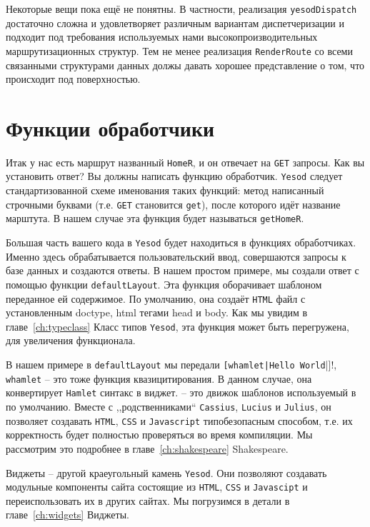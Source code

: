 Некоторые вещи пока ещё не понятны. В частности, реализация \lstinline!yesodDispatch!
достаточно сложна и удовлетворяет различным вариантам диспетчеризации
и подходит под требования используемых нами высокопроизводительных 
маршрутизационных структур.
Тем не менее реализация \lstinline!RenderRoute! со всеми связанными 
структурами данных должы давать хорошее представление о том, что происходит 
под поверхностью. %

\section{Функции обработчики}

Итак у нас есть маршрут названный \lstinline!HomeR!, и он отвечает на \texttt{GET} запросы. 
Как вы установить ответ? Вы должны написать функцию обработчик. \texttt{Yesod} следует
стандартизованной схеме именования таких функций: 
метод написанный строчными буквами (т.е. \texttt{GET} становится \lstinline!get!), после которого идёт 
название марштута. В нашем случае эта функция будет называться \lstinline!getHomeR!.

Большая часть вашего кода в \texttt{Yesod} будет находиться в функциях обработчиках. 
Именно здесь обрабатывается пользовательский ввод, совершаются запросы к базе данных и создаются ответы. 
В нашем простом примере, мы создали ответ с помощью функции \lstinline!defaultLayout!. 
Эта функция оборачивает шаблоном переданное ей содержимое.  По умолчанию, 
она создаёт \texttt{HTML} файл с установленным doctype, html тегами head и body. 
Как мы увидим в главе~\ref{ch:typeclass} Класс типов \texttt{Yesod}, 
эта функция может быть перегружена, для увеличения функционала.

В нашем примере в \lstinline!defaultLayout! мы передали 
\lstinline![whamlet|Hello World!|]!, \lstinline!whamlet! -- это тоже 
функция квазицитирования. В данном случае, она конвертирует 
\texttt{Hamlet} синтакс в виджет.  -- это движок 
 шаблонов используемый в  по умолчанию. 
Вместе с ,,родственниками`` \texttt{Cassius}, \texttt{Lucius} 
и \texttt{Julius}, он позволяет создавать \texttt{HTML}, \texttt{CSS}
и \texttt{Javascript} типобезопасным способом, т.е. их корректность будет 
полностью проверяться во время компиляции. Мы рассмотрим это подробнее в 
главе~\ref{ch:shakespeare} Shakespeare.

Виджеты -- другой краеугольный камень \texttt{Yesod}. Они позволяют создавать 
модульные компоненты сайта состоящие из \texttt{HTML}, \texttt{CSS} и 
\texttt{Javascipt} и переиспользовать их в других сайтах. 
Мы погрузимся в детали в главе~\ref{ch:widgets} Виджеты.


